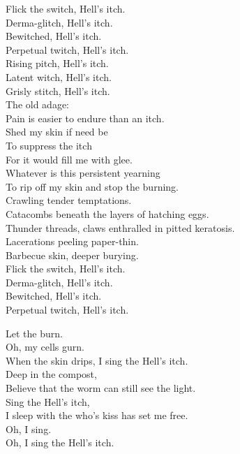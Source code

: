 Flick the switch, Hell's itch. \\
Derma-glitch, Hell's itch. \\
Bewitched, Hell's itch. \\
Perpetual twitch, Hell's itch. \\
Rising pitch, Hell's itch. \\
Latent witch, Hell's itch. \\
Grisly stitch, Hell's itch. \\

The old adage: \\
Pain is easier to endure than an itch. \\

Shed my skin if need be \\
To suppress the itch \\
For it would fill me with glee. \\
Whatever is this persistent yearning \\
To rip off my skin and stop the burning. \\

Crawling tender temptations. \\
Catacombs beneath the layers of hatching eggs. \\
Thunder threads, claws enthralled in pitted keratosis. \\
Lacerations peeling paper-thin. \\
Barbecue skin, deeper burying. \\

Flick the switch, Hell's itch. \\
Derma-glitch, Hell's itch. \\
Bewitched, Hell's itch. \\
Perpetual twitch, Hell's itch. \\


Let the  burn. \\
Oh, my cells gurn. \\
When the skin drips, I sing the Hell's itch. \\
Deep in the compost, \\
Believe that the worm can still see the light. \\
Sing the Hell's itch, \\
I sleep with the  who's kiss has set me free. \\
Oh, I sing. \\
Oh, I sing the Hell's itch. \\

